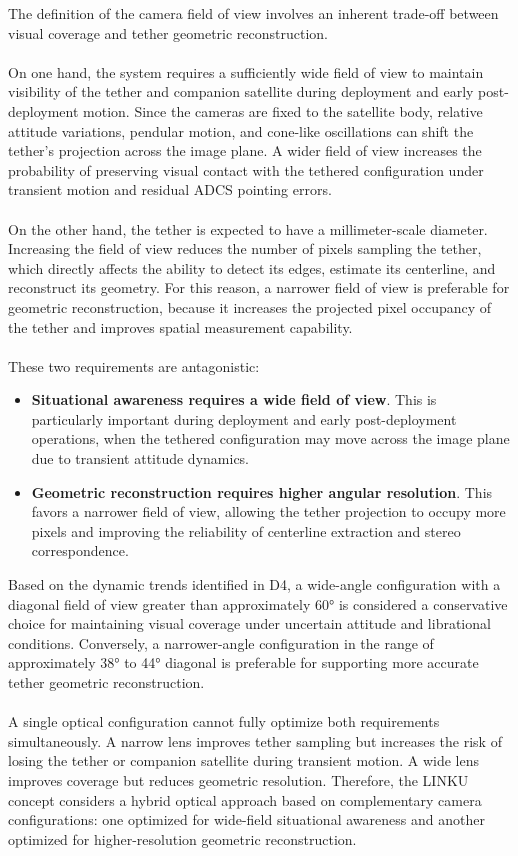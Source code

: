 The definition of the camera field of view involves an inherent trade-off between visual coverage and tether geometric reconstruction.
\\\\
On one hand, the system requires a sufficiently wide field of view to maintain visibility of the tether and companion satellite during deployment and early post-deployment motion. Since the cameras are fixed to the satellite body, relative attitude variations, pendular motion, and cone-like oscillations can shift the tether's projection across the image plane. A wider field of view increases the probability of preserving visual contact with the tethered configuration under transient motion and residual ADCS pointing errors.
\\\\
On the other hand, the tether is expected to have a millimeter-scale diameter. Increasing the field of view reduces the number of pixels sampling the tether, which directly affects the ability to detect its edges, estimate its centerline, and reconstruct its geometry. For this reason, a narrower field of view is preferable for geometric reconstruction, because it increases the projected pixel occupancy of the tether and improves spatial measurement capability.
\\\\
These two requirements are antagonistic:

\begin{itemize}
    \item \textbf{Situational awareness requires a wide field of view}. This is particularly important during deployment and early post-deployment operations, when the tethered configuration may move across the image plane due to transient attitude dynamics.
    \item \textbf{Geometric reconstruction requires higher angular resolution}. This favors a narrower field of view, allowing the tether projection to occupy more pixels and improving the reliability of centerline extraction and stereo correspondence.
\end{itemize}

Based on the dynamic trends identified in D4, a wide-angle configuration with a diagonal field of view greater than approximately 60° is considered a conservative choice for maintaining visual coverage under uncertain attitude and librational conditions. Conversely, a narrower-angle configuration in the range of approximately 38° to 44° diagonal is preferable for supporting more accurate tether geometric reconstruction.
\\\\
A single optical configuration cannot fully optimize both requirements simultaneously. A narrow lens improves tether sampling but increases the risk of losing the tether or companion satellite during transient motion. A wide lens improves coverage but reduces geometric resolution. Therefore, the LINKU concept considers a hybrid optical approach based on complementary camera configurations: one optimized for wide-field situational awareness and another optimized for higher-resolution geometric reconstruction.

